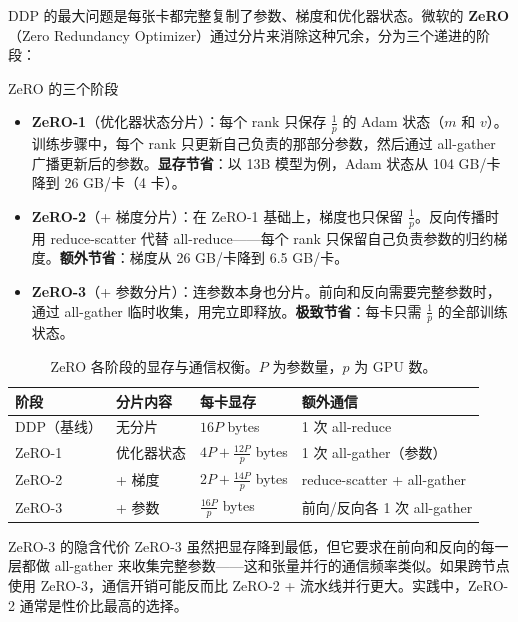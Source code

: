 \documentclass[a4paper]{article}
\begin{document}
DDP 的最大问题是每张卡都完整复制了参数、梯度和优化器状态。微软的 \textbf{ZeRO}（Zero Redundancy Optimizer）通过分片来消除这种冗余，分为三个递进的阶段：

\begin{knowledgebox}{ZeRO 的三个阶段}
\begin{itemize}
    \item \textbf{ZeRO-1}（优化器状态分片）：每个 rank 只保存 $\frac{1}{p}$ 的 Adam 状态（$m$ 和 $v$）。训练步骤中，每个 rank 只更新自己负责的那部分参数，然后通过 all-gather 广播更新后的参数。\textbf{显存节省}：以 13B 模型为例，Adam 状态从 104 GB/卡降到 26 GB/卡（4 卡）。
    \item \textbf{ZeRO-2}（+ 梯度分片）：在 ZeRO-1 基础上，梯度也只保留 $\frac{1}{p}$。反向传播时用 reduce-scatter 代替 all-reduce——每个 rank 只保留自己负责参数的归约梯度。\textbf{额外节省}：梯度从 26 GB/卡降到 6.5 GB/卡。
    \item \textbf{ZeRO-3}（+ 参数分片）：连参数本身也分片。前向和反向需要完整参数时，通过 all-gather 临时收集，用完立即释放。\textbf{极致节省}：每卡只需 $\frac{1}{p}$ 的全部训练状态。
\end{itemize}
\end{knowledgebox}

\begin{table}[H]
\centering
\small
\begin{tabular}{p{2.2cm}p{3cm}p{3cm}p{3.8cm}}
\toprule
\textbf{阶段} & \textbf{分片内容} & \textbf{每卡显存} & \textbf{额外通信} \\
\midrule
DDP（基线） & 无分片 & $16P$ bytes & 1 次 all-reduce \\
ZeRO-1 & 优化器状态 & $4P + \frac{12P}{p}$ bytes & 1 次 all-gather（参数） \\
ZeRO-2 & + 梯度 & $2P + \frac{14P}{p}$ bytes & reduce-scatter + all-gather \\
ZeRO-3 & + 参数 & $\frac{16P}{p}$ bytes & 前向/反向各 1 次 all-gather \\
\bottomrule
\end{tabular}
\caption{ZeRO 各阶段的显存与通信权衡。$P$ 为参数量，$p$ 为 GPU 数。}
\end{table}

\begin{warningbox}{ZeRO-3 的隐含代价}
ZeRO-3 虽然把显存降到最低，但它要求在前向和反向的每一层都做 all-gather 来收集完整参数——这和张量并行的通信频率类似。如果跨节点使用 ZeRO-3，通信开销可能反而比 ZeRO-2 + 流水线并行更大。实践中，ZeRO-2 通常是性价比最高的选择。
\end{warningbox}
\end{document}

